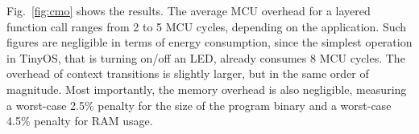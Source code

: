  Fig.~\ref{fig:cmo} shows the results. The average MCU
overhead for a layered function call ranges from 2 to 5 MCU cycles,
depending on the application. Such figures are negligible in terms of
energy consumption, since the simplest operation in TinyOS, that is
turning on/off an LED, already consumes 8 MCU cycles. The overhead of
context transitions is slightly larger, but in the same order of
magnitude. Most importantly, the memory overhead is also negligible,
measuring a worst-case 2.5\% penalty for the size of the program
binary and a worst-case 4.5\% penalty for RAM usage.



